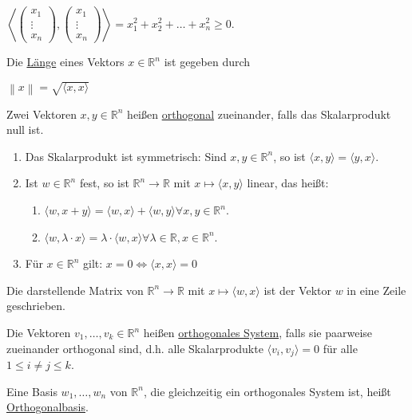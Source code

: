 \documentclass{mg2}
\begin{document}
\begin{beobachtung}
$\left\langle \begin{pmatrix}x_1\\\vdots\\x_n\end{pmatrix},\begin{pmatrix}x_1\\\vdots\\x_n\end{pmatrix} \right\rangle = x_1^2 + x_2^2 + \dots + x_n^2 \geq 0$.
\end{beobachtung}

\begin{definition}
Die \underline{Länge} eines Vektors $x \in \mathbb{R}^n$ ist gegeben durch

$\left\| x \right\| = \sqrt{\langle x,x \rangle}$
\end{definition}

\begin{definition}[Orthogonalität]
Zwei Vektoren $x,y \in \mathbb{R}^n$ heißen \underline{orthogonal} zueinander, falls das Skalarprodukt null ist.
\end{definition}

\begin{satz}
\begin{enumerate}
\item Das Skalarprodukt ist symmetrisch: Sind $x,y \in \mathbb{R}^n$, so ist $\langle x,y \rangle = \langle y,x \rangle$.
\item Ist $w \in \mathbb{R}^n$ fest, so ist $\mathbb{R}^n \to \mathbb{R}$ mit $x \mapsto \langle x,y \rangle$ linear, das heißt:
\begin{enumerate}
\item $\langle w, x+y \rangle = \langle w,x \rangle + \langle w,y \rangle \forall x,y \in \mathbb{R}^n$.
\item $\langle w, \lambda \cdot x \rangle = \lambda \cdot \langle w,x \rangle \forall \lambda \in \mathbb{R}, x \in \mathbb{R}^n$.
\end{enumerate}
\item Für $ x \in \mathbb{R}^n$ gilt: $x = 0 \Leftrightarrow \langle x,x \rangle = 0$
\end{enumerate}
\end{satz}
Die darstellende Matrix von $\mathbb{R}^n \to \mathbb{R}$ mit $x \mapsto \langle w,x \rangle$ ist der Vektor $w$ in eine Zeile geschrieben.

\begin{definition}
Die Vektoren $v_1, \dots, v_k \in \mathbb{R}^n$ heißen \underline{orthogonales System}, falls sie paarweise zueinander orthogonal sind, d.h. alle Skalarprodukte $\langle v_i,v_j \rangle = 0$ für alle $1 \leq i \neq j \leq k$.

Eine Basis $w_1,\dots,w_n$ von $\mathbb{R}^n$, die gleichzeitig ein orthogonales System ist, heißt \underline{Orthogonalbasis}.
\end{definition}
\end{document}

